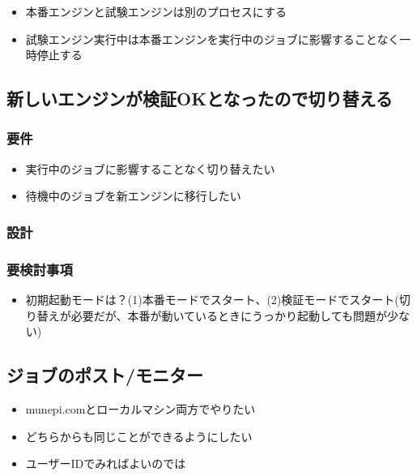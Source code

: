 \documentclass{jsbook}
\begin{document}
\begin{itemize}
    \item 本番エンジンと試験エンジンは別のプロセスにする
    \item 試験エンジン実行中は本番エンジンを実行中のジョブに影響することなく一時停止する
\end{itemize}

\subsection{新しいエンジンが検証OKとなったので切り替える}

\subsubsection{要件}

\begin{itemize}
    \item 実行中のジョブに影響することなく切り替えたい
    \item 待機中のジョブを新エンジンに移行したい
\end{itemize}

\subsubsection{設計}



\subsubsection{要検討事項}

\begin{itemize}
    \item 初期起動モードは？(1)本番モードでスタート、(2)検証モードでスタート(切り替えが必要だが、本番が動いているときにうっかり起動しても問題が少ない)
\end{itemize}

\subsubsection{}


\subsection{ジョブのポスト/モニター}

\begin{itemize}
    \item munepi.comとローカルマシン両方でやりたい
    \item どちらからも同じことができるようにしたい
	\item ユーザーIDでみればよいのでは
\end{itemize}


\subsection{}
\subsubsection{}
\subsubsection{}
\end{document}
